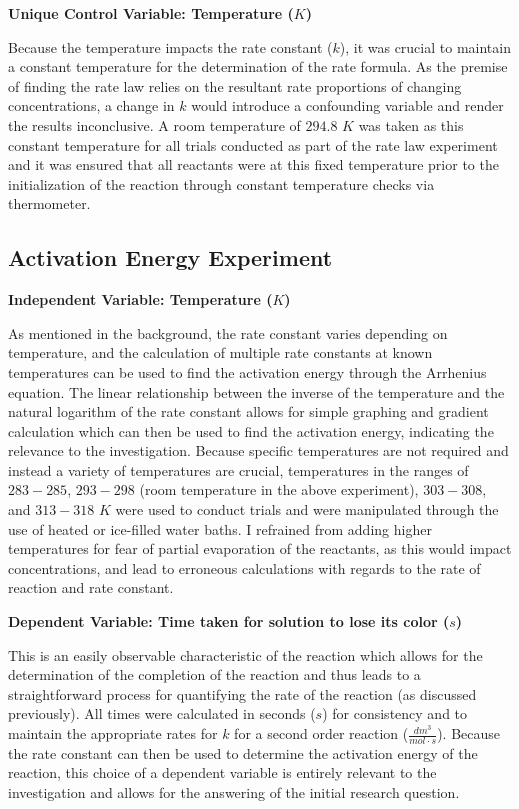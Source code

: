 \textbf{Unique Control Variable: Temperature ($K$)} 

Because the temperature impacts the rate constant ($k$), it was crucial to maintain a constant temperature for the determination of the rate formula. As the premise of finding the rate law relies on the resultant rate proportions of changing concentrations, a change in $k$ would introduce a confounding variable and render the results inconclusive. A room temperature of $294.8$ $K$ was taken as this constant temperature for all trials conducted as part of the rate law experiment and it was ensured that all reactants were at this fixed temperature prior to the initialization of the reaction through constant temperature checks via thermometer.

\subsection{Activation Energy Experiment}

\textbf{Independent Variable: Temperature ($K$)} 

As mentioned in the background, the rate constant varies depending on temperature, and the calculation of multiple rate constants at known temperatures can be used to find the activation energy through the Arrhenius equation. The linear relationship between the inverse of the temperature and the natural logarithm of the rate constant allows for simple graphing and gradient calculation which can then be used to find the activation energy, indicating the relevance to the investigation. Because specific temperatures are not required and instead a variety of temperatures are crucial, temperatures in the ranges of $283-285$, $293-298$ (room temperature in the above experiment), $303-308$, and $313-318$ $K$ were used to conduct trials and were manipulated through the use of heated or ice-filled water baths. I refrained from adding higher temperatures for fear of partial evaporation of the reactants, as this would impact concentrations, and lead to erroneous calculations with regards to the rate of reaction and rate constant.

\textbf{Dependent Variable: Time taken for solution to lose its color ($s$)} 

This is an easily observable characteristic of the reaction which allows for the determination of the completion of the reaction and thus leads to a straightforward process for quantifying the rate of the reaction (as discussed previously). All times were calculated in seconds ($s$) for consistency and to maintain the appropriate rates for $k$ for a second order reaction ($\frac{dm^3}{mol \cdot s}$). Because the rate constant can then be used to determine the activation energy of the reaction, this choice of a dependent variable is entirely relevant to the investigation and allows for the answering of the initial research question. 

